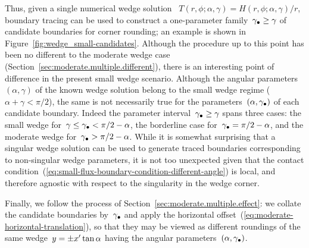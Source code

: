 \begin{figure}
\end{figure}

Thus, given a single numerical wedge solution~%
  $T (r, \phi; \alpha, \gamma) = H (r, \phi; \alpha, \gamma) / r$,
boundary tracing can be used to construct
a one-parameter family~$\gamma_\bullet \ge \gamma$
of candidate boundaries for corner rounding;
an example is shown in Figure~\ref{fig:wedge_small-candidates}.
Although the procedure up to this point
has been no different to the moderate wedge case
(Section~\ref{sec:moderate.multiple.different}),
there is an interesting point of difference
in the present small wedge scenario.
Although the angular parameters~$(\alpha, \gamma)$
of the known wedge solution
belong to the small wedge regime ($\alpha + \gamma < \pi/2$),
the same is not necessarily true
for the parameters~$(\alpha, \gamma_\bullet)$
of each candidate boundary.
Indeed the parameter interval~$\gamma_\bullet \ge \gamma$ spans three cases:
the small wedge for~$\gamma \le \gamma_\bullet < \pi/2 - \alpha$,
the borderline case for~$\gamma_\bullet = \pi/2 - \alpha$,
and the moderate wedge for~$\gamma_\bullet > \pi/2 - \alpha$.
While it is somewhat surprising that a singular wedge solution
can be used to generate traced boundaries corresponding to
non-singular wedge parameters,
it is not too unexpected given that
the contact condition~(\ref{eq:small-flux-boundary-condition-different-angle})
is local,
and therefore agnostic
with respect to the singularity in the wedge corner.

Finally, we follow the process of Section~\ref{sec:moderate.multiple.effect}:
we collate the candidate boundaries by~$\gamma_\bullet$
and apply the horizontal offset~(\ref{eq:moderate-horizontal-translation}),
so that they may be viewed as different roundings
of the same wedge~$y = \pm x' \tan\alpha$
having the angular parameters~$(\alpha, \gamma_\bullet)$.

